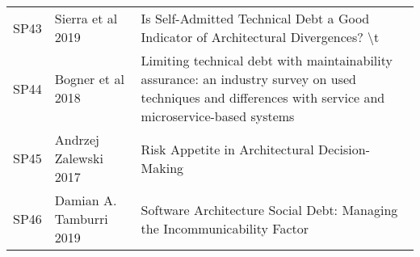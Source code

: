 \begin{tabular}{lll}
 SP43 &               Sierra et al 2019 &                                                                                         Is Self-Admitted Technical Debt a Good Indicator of Architectural Divergences?  \textbackslash t \\
 SP44 &               Bogner et al 2018 &                  Limiting technical debt with maintainability assurance: an industry survey on used techniques and differences with service and microservice-based systems \\
 SP45 &           Andrzej Zalewski 2017 &                                                                                                                             Risk Appetite in Architectural Decision-Making \\
 SP46 &         Damian A. Tamburri 2019 &                                                                                                   Software Architecture Social Debt: Managing the Incommunicability Factor \\
\bottomrule
\end{tabular}
